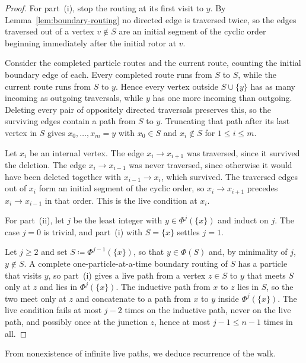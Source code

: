 \documentclass[11pt]{amsart}
\theoremstyle{plain}
\theoremstyle{definition}
\begin{document}
	\begin{proof}
		For part~\textup{(i)}, stop the routing at its first visit to $y$.  By
		Lemma~\ref{lem:boundary-routing} no directed edge is traversed twice, so the
		edges traversed out of a vertex $v\notin S$ are an initial segment of the
		cyclic order beginning immediately after the initial rotor at $v$.
		
		Consider the completed particle routes and the current route, counting the
		initial boundary edge of each.  Every completed route runs from $S$ to $S$,
		while the current route runs from $S$ to $y$.  Hence every vertex outside
		$S\cup\{y\}$ has as many
		incoming as outgoing traversals, while $y$ has one more incoming than outgoing.
		Deleting every pair of oppositely directed traversals preserves this, so the
		surviving edges contain a path from $S$ to $y$.  Truncating that path after its
		last vertex in $S$ gives $x_0,\ldots,x_m=y$ with $x_0\in S$ and $x_i\notin S$
		for $1\leq i\leq m$.
		
		Let $x_i$ be an internal vertex.  The edge $x_i\to x_{i+1}$ was traversed,
		since it survived the deletion.  The edge $x_i\to x_{i-1}$ was never traversed,
		since otherwise it would have been deleted together with $x_{i-1}\to x_i$,
		which survived.  The traversed edges out of $x_i$ form an initial segment of
		the cyclic order, so $x_i\to x_{i+1}$ precedes $x_i\to x_{i-1}$ in that order.
		This is the live condition at $x_i$.
		
		For part~\textup{(ii)}, let $j$ be the least integer with
		$y\in\Phi^j(\{x\})$ and induct on $j$.  The case $j=0$ is trivial, and
		part~\textup{(i)} with $S=\{x\}$ settles $j=1$.
		
		Let $j\geq2$ and set $S\coloneqq\Phi^{j-1}(\{x\})$, so that $y\in\Phi(S)$
		and, by minimality of $j$, $y\notin S$.  A complete one-particle-at-a-time
		boundary routing of $S$ has a particle that visits $y$, so part~\textup{(i)}
		gives a live path from a vertex $z\in S$ to $y$ that meets $S$ only at $z$ and
		lies in $\Phi^j(\{x\})$.  The inductive path from $x$ to $z$ lies in $S$, so
		the two meet only at $z$ and concatenate to a path from $x$ to $y$ inside
		$\Phi^j(\{x\})$.  The live condition fails at most $j-2$ times on the
		inductive path, never on the live path, and possibly once at the junction $z$,
		hence at most $j-1\leq n-1$ times in all.
	\end{proof}
	
	From nonexistence of infinite live paths, we deduce recurrence of the walk.
	
\end{document}
